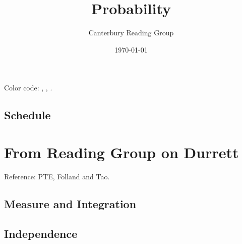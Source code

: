 \documentclass[12pt, oneside]{book}
\begin{document}
    \title{Probability}\author{Canterbury Reading Group}\date{\today}
    \tableofcontents
    Color code:  , , . 
    \section*{Schedule}
    \chapter{From Reading Group on Durrett} Reference: PTE, Folland and Tao. 
        \section{Measure and Integration}
        \section{Independence}

\end{document}
